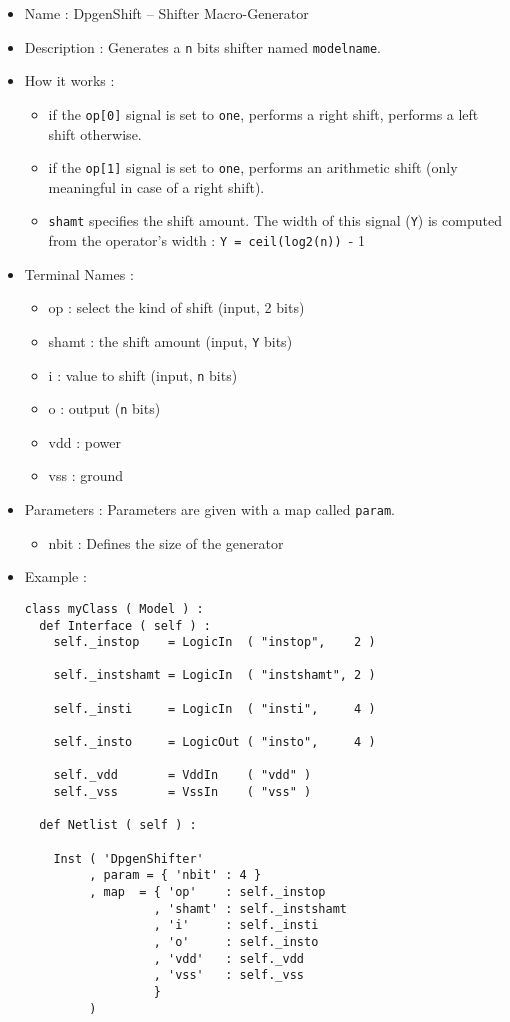 \begin{itemize}
    \item Name : DpgenShift -- Shifter Macro-Generator
    \item Description : Generates a \verb-n- bits shifter named \verb-modelname-.
    \item How it works :
    \begin{itemize}
        \item if the \verb-op[0]- signal is set to \verb-one-, performs a right shift, performs a left shift otherwise.
        \item if the \verb-op[1]- signal is set to \verb-one-, performs an arithmetic shift (only meaningful in case of a right shift).
        \item \verb-shamt- specifies the shift amount. The width of this signal (\verb-Y-) is computed from the operator's width : \verb-Y = ceil(log2(n)) -- 1
    \end{itemize}
    \item Terminal Names :
    \begin{itemize}
        \item op : select the kind of shift (input, 2 bits)
        \item shamt : the shift amount (input, \verb-Y- bits)
        \item i : value to shift (input, \verb-n- bits)
        \item o : output (\verb-n- bits)
        \item vdd : power
        \item vss : ground
    \end{itemize}
    \item Parameters : Parameters are given with a map called \verb-param-.
    \begin{itemize}
        \item nbit : Defines the size of the generator
    \end{itemize}
    \item Example :
\begin{verbatim}
class myClass ( Model ) :
  def Interface ( self ) :
    self._instop    = LogicIn  ( "instop",    2 )
    
    self._instshamt = LogicIn  ( "instshamt", 2 )
    
    self._insti     = LogicIn  ( "insti",     4 )
    
    self._insto     = LogicOut ( "insto",     4 )
    
    self._vdd       = VddIn    ( "vdd" )
    self._vss       = VssIn    ( "vss" )
    
  def Netlist ( self ) :
      
    Inst ( 'DpgenShifter'
         , param = { 'nbit' : 4 }
         , map  = { 'op'    : self._instop
                  , 'shamt' : self._instshamt
                  , 'i'     : self._insti
                  , 'o'     : self._insto
                  , 'vdd'   : self._vdd
                  , 'vss'   : self._vss
                  }
         )
\end{verbatim}
\end{itemize}
